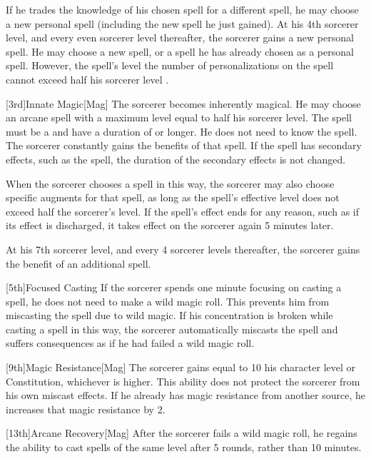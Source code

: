         If he trades the knowledge of his chosen spell for a different spell, he may choose a new personal spell (including the new spell he just gained).
        At his 4th sorcerer level, and every even sorcerer level thereafter, the sorcerer gains a new personal spell.
        He may choose a new spell, or a spell he has already chosen as a personal spell.
        However, the spell's level \add the number of personalizations on the spell cannot exceed half his sorcerer level .

        [3rd]{Innate Magic}[Mag]
        The sorcerer becomes inherently magical.
        He may choose an arcane spell with a maximum level equal to half his sorcerer level.
        The spell must be a  and have a duration of \durshort or longer.
        He does not need to know the spell.
        The sorcerer constantly gains the benefits of that spell.
        If the spell has secondary effects, such as the  spell, the duration of the secondary effects is not changed.

        When the sorcerer chooses a spell in this way, the sorcerer may also choose specific augments for that spell, as long as the spell's effective level does not exceed half the sorcerer's level.
        If the spell's effect ends for any reason, such as if its effect is discharged, it takes effect on the sorcerer again 5 minutes later.

        At his 7th sorcerer level, and every 4 sorcerer levels thereafter, the sorcerer gains the benefit of an additional spell.

        [5th]{Focused Casting}
        If the sorcerer spends one minute focusing on casting a spell, he does not need to make a wild magic roll.
        This prevents him from miscasting the spell due to wild magic.
        If his concentration is broken while casting a spell in this way, the sorcerer automatically miscasts the spell and suffers consequences as if he had failed a wild magic roll.

        [9th]{Magic Resistance}[Mag]
        The sorcerer gains  equal to 10 \add his character level or Constitution, whichever is higher.
        This ability does not protect the sorcerer from his own miscast effects.
        If he already has magic resistance from another source, he increases that magic resistance by 2.

        [13th]{Arcane Recovery}[Mag]
        After the sorcerer fails a wild magic roll, he regains the ability to cast spells of the same level after 5 rounds, rather than 10 minutes.

